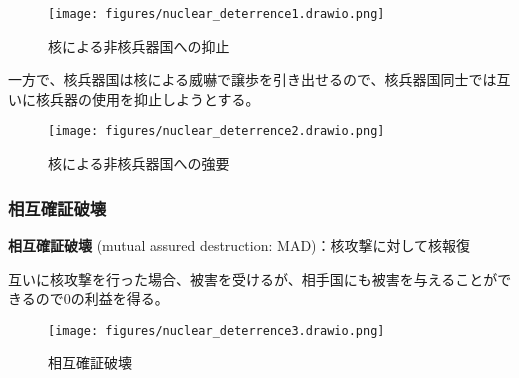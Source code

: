 \documentclass[
  xelatex,
  ja=standard]{bxjsarticle}
\begin{document}
\begin{figure}[htpb]

{\centering \texttt{[image: figures/nuclear\_deterrence1.drawio.png]}

}

\caption{核による非核兵器国への抑止}

\end{figure}

一方で、核兵器国は核による威嚇で譲歩を引き出せるので、核兵器国同士では互いに核兵器の使用を抑止しようとする。

\begin{figure}[htpb]

{\centering \texttt{[image: figures/nuclear\_deterrence2.drawio.png]}

}

\caption{核による非核兵器国への強要}

\end{figure}

\hypertarget{ux76f8ux4e92ux78baux8a3cux7834ux58ca}{%
\subsubsection{相互確証破壊}\label{ux76f8ux4e92ux78baux8a3cux7834ux58ca}}

\textbf{相互確証破壊} (mutual assured destruction:
MAD)：核攻撃に対して核報復

\begin{tcolorbox}[enhanced jigsaw, opacityback=0, leftrule=.75mm, toptitle=1mm, colframe=quarto-callout-tip-color-frame, arc=.35mm, bottomrule=.15mm, coltitle=black, bottomtitle=1mm, colbacktitle=quarto-callout-tip-color!10!white, titlerule=0mm, breakable, title=\textcolor{quarto-callout-tip-color}{\faLightbulb}\hspace{0.5em}{相互確証破壊}, left=2mm, rightrule=.15mm, toprule=.15mm, opacitybacktitle=0.6, colback=white]

互いに核攻撃を行った場合、被害を受けるが、相手国にも被害を与えることができるので0の利益を得る。

\end{tcolorbox}

\begin{figure}[htpb]

{\centering \texttt{[image: figures/nuclear\_deterrence3.drawio.png]}

}

\caption{相互確証破壊}

\end{figure}
\end{document}
